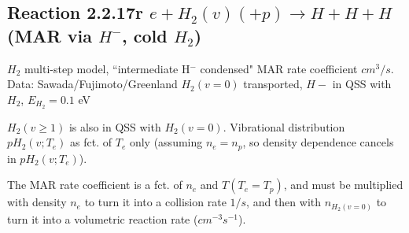 \documentclass[12pt,dvipdfmx]{article}
\begin{document}
\subsection{
Reaction 2.2.17r   $e + H_2(v) (+p)   \rightarrow H + H + H  $ (MAR via $H^-$, cold $H_2$)
}

$H_2$ multi-step model, ``intermediate H$^-$ condensed" MAR rate coefficient $cm^3/s$.
Data: Sawada/Fujimoto/Greenland \cite{kn:Sawada}
$H_2(v=0)$ transported, $H-$ in QSS with $H_2$, $E_{H_2}=0.1$ eV

$H_2(v\geq 1)$ is also in QSS with $H_2(v=0)$. Vibrational distribution $pH_2(v;T_e)$ as fct. of $T_e$ only (assuming $n_e=n_p$, so density
dependence cancels in $pH_2(v;T_e)$).

The MAR rate coefficient is a fct. of $n_e$ and $T (T_e=T_p)$, and must be multiplied with density $n_e$ to turn it into a collision rate $1/s$,
and then with $n_{H_2(v=0)}$ to turn it into a volumetric reaction rate ($cm^{-3}s^{-1}$).
\end{document}
